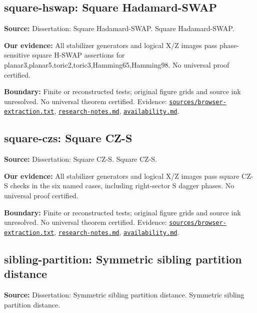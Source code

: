 \documentclass[11pt]{article}
\begin{document}
\subsection{square-hswap: Square Hadamard-SWAP}
\label{claim:square-hswap}
\textbf{Source:} Dissertation: Square Hadamard-SWAP. Square Hadamard-SWAP.

\textbf{Our evidence:} All stabilizer generators and logical X/Z images pass phase-sensitive square H-SWAP assertions for planar3,planar5,toric2,toric3,Hamming65,Hamming98. No universal proof certified.

\textbf{Boundary:} Finite or reconstructed tests; original figure grids and source ink unresolved. No universal theorem certified. Evidence: \href{https://github.com/alectionary/vibe-math/blob/master/formalization/quintavalle-hgp/sources/browser-extraction.txt}{\nolinkurl{sources/browser-extraction.txt}}, \href{https://github.com/alectionary/vibe-math/blob/master/formalization/quintavalle-hgp/research-notes.md}{\nolinkurl{research-notes.md}}, \href{https://github.com/alectionary/vibe-math/blob/master/formalization/quintavalle-hgp/availability.md}{\nolinkurl{availability.md}}.
\subsection{square-czs: Square CZ-S}
\label{claim:square-czs}
\textbf{Source:} Dissertation: Square CZ-S. Square CZ-S.

\textbf{Our evidence:} All stabilizer generators and logical X/Z images pass square CZ-S checks in the six named cases, including right-sector S dagger phases. No universal proof certified.

\textbf{Boundary:} Finite or reconstructed tests; original figure grids and source ink unresolved. No universal theorem certified. Evidence: \href{https://github.com/alectionary/vibe-math/blob/master/formalization/quintavalle-hgp/sources/browser-extraction.txt}{\nolinkurl{sources/browser-extraction.txt}}, \href{https://github.com/alectionary/vibe-math/blob/master/formalization/quintavalle-hgp/research-notes.md}{\nolinkurl{research-notes.md}}, \href{https://github.com/alectionary/vibe-math/blob/master/formalization/quintavalle-hgp/availability.md}{\nolinkurl{availability.md}}.
\subsection{sibling-partition: Symmetric sibling partition distance}
\label{claim:sibling-partition}
\textbf{Source:} Dissertation: Symmetric sibling partition distance. Symmetric sibling partition distance.
\end{document}
